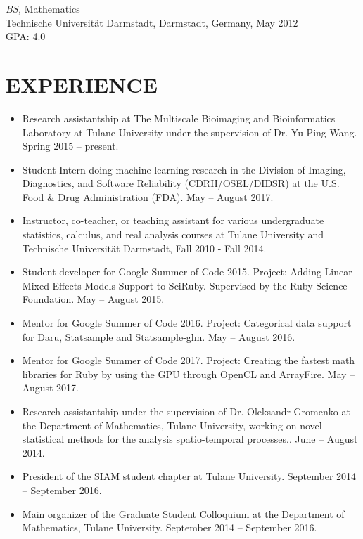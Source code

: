 \documentclass[margin]{res} %
\begin{document}
\begin{resume}
{\sl BS,} Mathematics\\
Technische Universit\"{a}t Darmstadt, Darmstadt, Germany, May 2012\\
GPA: 4.0


\section{EXPERIENCE}

\begin{itemize}
    \item Research assistantship at The Multiscale Bioimaging and Bioinformatics Laboratory at Tulane University under the supervision of Dr. Yu-Ping Wang. Spring 2015 -- present.
    \item Student Intern doing machine learning research in the Division of Imaging, Diagnostics, and Software Reliability (CDRH/OSEL/DIDSR) at the U.S. Food \& Drug Administration (FDA). May -- August 2017.
    \item Instructor, co-teacher, or teaching assistant for various undergraduate statistics, calculus, and real analysis courses at Tulane University and Technische Universit\"{a}t Darmstadt, Fall 2010 - Fall 2014.
    \item Student developer for Google Summer of Code 2015. Project: Adding Linear Mixed Effects Models Support to SciRuby. Supervised by the Ruby Science Foundation. May -- August 2015.
    \item Mentor for Google Summer of Code 2016. Project: Categorical data support for Daru, Statsample and Statsample-glm. May -- August 2016.
    \item Mentor for Google Summer of Code 2017. Project: Creating the fastest math libraries for Ruby by using the GPU through OpenCL and ArrayFire. May -- August 2017.
    \item Research assistantship under the supervision of Dr. Oleksandr Gromenko at the Department of Mathematics, Tulane University, working on novel statistical methods for the analysis spatio-temporal processes.. June -- August 2014.
    \item President of the SIAM student chapter at Tulane University. September 2014 -- September 2016.
    \item Main organizer of the Graduate Student Colloquium at the Department of Mathematics, Tulane University. September 2014 -- September 2016.
\end{itemize}
 

\end{resume}
\end{document}
